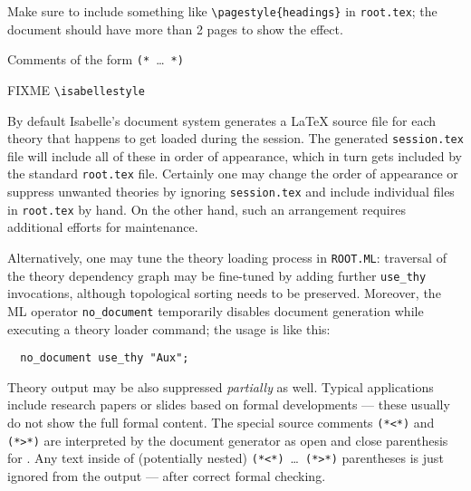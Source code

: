 \begin{isabellebody}
\begin{isamarkuptext}
  \noindent Make sure to include something like
  \verb,\pagestyle{headings}, in \texttt{root.tex}; the document
  should have more than 2 pages to show the effect.%
\end{isamarkuptext}%
\isamarkuptrue%
%
\isamarkuptrue%
%
\begin{isamarkuptext}%
Comments of the form \verb,(,\verb,*,~\dots~\verb,*,\verb,),%
\end{isamarkuptext}%
\isamarkuptrue%
%
\isamarkuptrue%
%
\begin{isamarkuptext}%
FIXME \verb,\isabellestyle,%
\end{isamarkuptext}%
\isamarkuptrue%
%
\isamarkuptrue%
%
\begin{isamarkuptext}%
By default Isabelle's document system generates a {\LaTeX} source
  file for each theory that happens to get loaded during the session.
  The generated \texttt{session.tex} file will include all of these in
  order of appearance, which in turn gets included by the standard
  \texttt{root.tex} file.  Certainly one may change the order of
  appearance or suppress unwanted theories by ignoring
  \texttt{session.tex} and include individual files in
  \texttt{root.tex} by hand.  On the other hand, such an arrangement
  requires additional efforts for maintenance.

  Alternatively, one may tune the theory loading process in
  \texttt{ROOT.ML}: traversal of the theory dependency graph may be
  fine-tuned by adding further \verb,use_thy, invocations, although
  topological sorting needs to be preserved.  Moreover, the ML
  operator \verb,no_document, temporarily disables document generation
  while executing a theory loader command; the usage is like this:

\begin{verbatim}
  no_document use_thy "Aux";
\end{verbatim}

  Theory output may be also suppressed \emph{partially} as well.
  Typical applications include research papers or slides based on
  formal developments --- these usually do not show the full formal
  content.  The special source comments
  \verb,(,\verb,*,\verb,<,\verb,*,\verb,), and
  \verb,(,\verb,*,\verb,>,\verb,*,\verb,), are interpreted by the
  document generator as open and close parenthesis for
  .  Any text inside of (potentially nested)
  \verb,(,\verb,*,\verb,<,\verb,*,\verb,),~\dots~\verb,(,\verb,*,\verb,>,\verb,*,\verb,),
  parentheses is just ignored from the output --- after correct formal
  checking.


\end{isamarkuptext}
\end{isabellebody}
